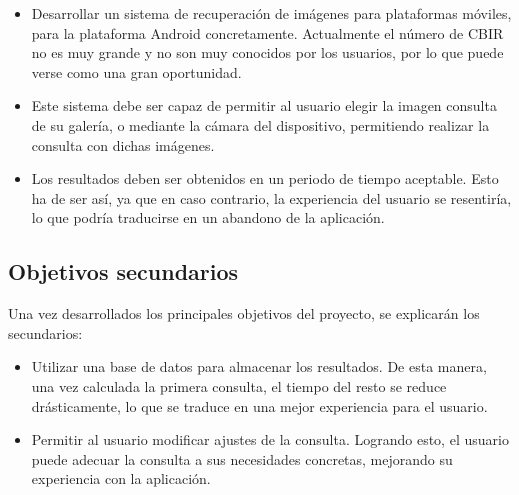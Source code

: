 \begin{itemize}
  \item Desarrollar un sistema de recuperación de imágenes para plataformas móviles, para la plataforma Android concretamente. Actualmente el número de CBIR no es muy grande y no son muy conocidos por los usuarios, por lo que puede verse como una gran oportunidad.
  
  \item Este sistema debe ser capaz de permitir al usuario elegir la imagen consulta de su galería, o mediante la cámara del dispositivo, permitiendo realizar la consulta con dichas imágenes.
  
  \item Los resultados deben ser obtenidos en un periodo de tiempo aceptable. Esto ha de ser así, ya que en caso contrario, la experiencia del usuario se resentiría, lo que podría traducirse en un abandono de la aplicación.  
\end{itemize}


\subsection{Objetivos secundarios}

Una vez desarrollados los principales objetivos del proyecto, se explicarán los secundarios:

\begin{itemize}
  \item Utilizar una base de datos para almacenar los resultados. De esta manera, una vez calculada la primera consulta, el tiempo del resto se reduce drásticamente, lo que se traduce en una mejor experiencia para el usuario.

  \item Permitir al usuario modificar ajustes de la consulta. Logrando esto, el usuario puede adecuar la consulta a sus necesidades concretas, mejorando su experiencia con la aplicación.
\end{itemize}




















